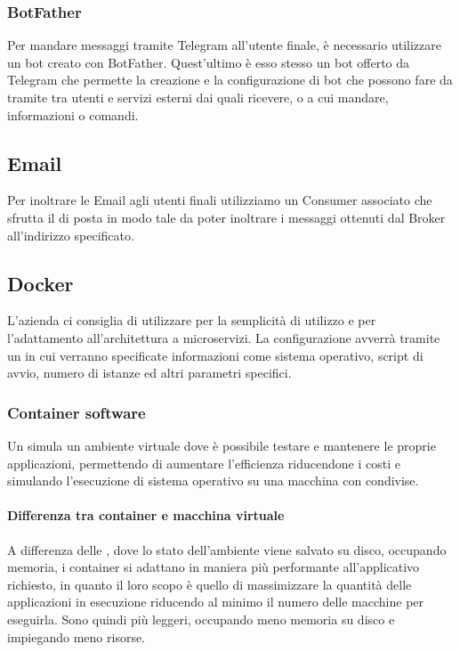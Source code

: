 		\subsubsection{BotFather}
		Per mandare messaggi tramite Telegram all'utente finale, è necessario utilizzare un bot creato con BotFather.
        Quest'ultimo è esso stesso un bot offerto da Telegram che permette la creazione e la configurazione di bot che
        possono fare da tramite tra utenti
        e servizi esterni dai quali ricevere, o a cui mandare, informazioni o comandi.

		\subsection{Email}
		Per inoltrare le Email agli utenti finali utilizziamo un Consumer associato che sfrutta il  di posta
        in modo tale da poter inoltrare i messaggi ottenuti dal Broker all'indirizzo specificato.

		\subsection{Docker}
		L'azienda ci consiglia di utilizzare  per la semplicità di utilizzo e per l'adattamento all'architettura a microservizi.
		La configurazione avverrà tramite un  in cui verranno specificate informazioni come sistema operativo, script di avvio,
        numero di istanze ed altri parametri specifici.
        
        \subsubsection{Container software}\label{TecnologieContainer}
        
        Un  simula un ambiente virtuale dove è possibile testare e mantenere le proprie applicazioni, permettendo di aumentare l'efficienza riducendone i costi e simulando l'esecuzione di sistema operativo su una macchina con  condivise.
        
        \paragraph{Differenza tra container e macchina virtuale}
        A differenza delle , dove lo stato dell'ambiente viene salvato su disco, occupando memoria, i container si adattano in maniera più performante all'applicativo richiesto, in quanto il loro scopo è quello di massimizzare la quantità delle applicazioni in esecuzione riducendo al minimo il numero delle macchine per eseguirla.
        Sono quindi più leggeri, occupando meno memoria su disco e impiegando meno risorse.
        
